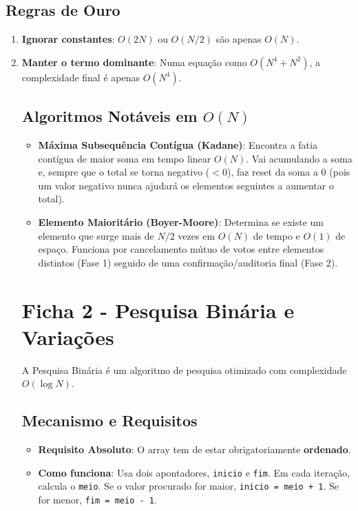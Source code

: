 \documentclass[12pt,a4paper]{article}
\begin{document}
\subsection*{Regras de Ouro}
\begin{enumerate}
    \item \textbf{Ignorar constantes}: $O(2N)$ ou $O(N/2)$ são apenas $O(N)$.
    \item \textbf{Manter o termo dominante}: Numa equação como $O(N^4 + N^2)$, a complexidade final é apenas $O(N^4)$.
\subsection*{Algoritmos Notáveis em $O(N)$}
\begin{itemize}
    \item \textbf{Máxima Subsequência Contígua (Kadane)}: Encontra a fatia contígua de maior soma em tempo linear $O(N)$. Vai acumulando a soma e, sempre que o total se torna negativo ($< 0$), faz reset da soma a 0 (pois um valor negativo nunca ajudará os elementos seguintes a aumentar o total).
    \item \textbf{Elemento Maioritário (Boyer-Moore)}: Determina se existe um elemento que surge mais de $N/2$ vezes em $O(N)$ de tempo e $O(1)$ de espaço. Funciona por cancelamento mútuo de votos entre elementos distintos (Fase 1) seguido de uma confirmação/auditoria final (Fase 2).
\end{itemize}



\section{Ficha 2 - Pesquisa Binária e Variações}
A Pesquisa Binária é um algoritmo de pesquisa otimizado com complexidade $O(\log N)$.

\subsection*{Mecanismo e Requisitos}
\begin{itemize}
    \item \textbf{Requisito Absoluto}: O array tem de estar obrigatoriamente \textbf{ordenado}.
    \item \textbf{Como funciona}: Usa dois apontadores, \texttt{inicio} e \texttt{fim}. Em cada iteração, calcula o \texttt{meio}. Se o valor procurado for maior, \texttt{inicio = meio + 1}. Se for menor, \texttt{fim = meio - 1}.
\end{itemize}


\end{enumerate}
\end{document}
